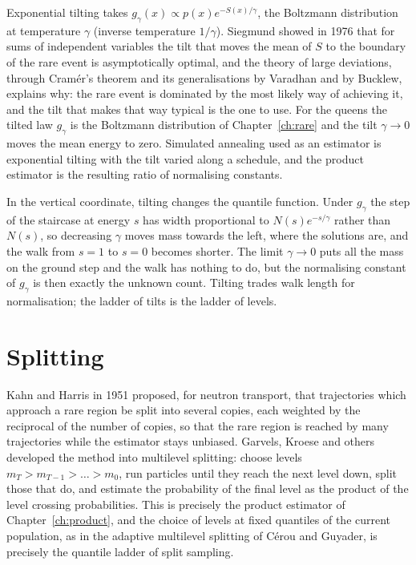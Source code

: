 Exponential tilting takes $g_\gamma(x) \propto p(x) e^{-S(x)/\gamma}$, the Boltzmann distribution at temperature $\gamma$ (inverse temperature $1/\gamma$). Siegmund showed in 1976 that for sums of independent variables the tilt that moves the mean of $S$ to the boundary of the rare event is asymptotically optimal, and the theory of large deviations, through Cram\'er's theorem and its generalisations by Varadhan and by Bucklew, explains why: the rare event is dominated by the most likely way of achieving it, and the tilt that makes that way typical is the one to use. For the queens the tilted law $g_\gamma$ is the Boltzmann distribution of Chapter~\ref{ch:rare} and the tilt $\gamma \to 0$ moves the mean energy to zero. Simulated annealing used as an estimator is exponential tilting with the tilt varied along a schedule, and the product estimator is the resulting ratio of normalising constants.

In the vertical coordinate, tilting changes the quantile function. Under $g_\gamma$ the step of the staircase at energy $s$ has width proportional to $N(s) e^{-s/\gamma}$ rather than $N(s)$, so decreasing $\gamma$ moves mass towards the left, where the solutions are, and the walk from $s = 1$ to $s = 0$ becomes shorter. The limit $\gamma \to 0$ puts all the mass on the ground step and the walk has nothing to do, but the normalising constant of $g_\gamma$ is then exactly the unknown count. Tilting trades walk length for normalisation; the ladder of tilts is the ladder of levels.

\section{Splitting}

Kahn and Harris in 1951 proposed, for neutron transport, that trajectories which approach a rare region be split into several copies, each weighted by the reciprocal of the number of copies, so that the rare region is reached by many trajectories while the estimator stays unbiased. Garvels, Kroese and others developed the method into multilevel splitting: choose levels $m_T > m_{T-1} > \dots > m_0$, run particles until they reach the next level down, split those that do, and estimate the probability of the final level as the product of the level crossing probabilities. This is precisely the product estimator of Chapter~\ref{ch:product}, and the choice of levels at fixed quantiles of the current population, as in the adaptive multilevel splitting of C\'erou and Guyader, is precisely the quantile ladder of split sampling.


